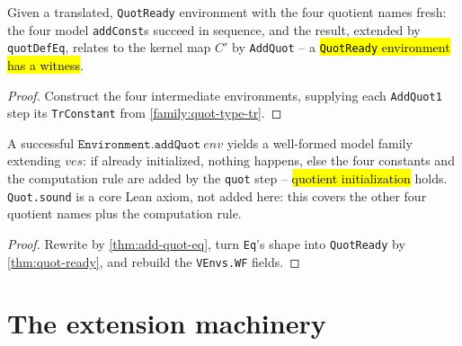\begin{theorem}
\label{thm:exists-add-quot}
\leanok
{}

 Given a translated, \texttt{QuotReady} environment with the four quotient
names fresh: the four model \texttt{addConst}s succeed in sequence, and the result,
extended by \texttt{quotDefEq}, relates to the kernel map $C'$ by \texttt{AddQuot} -- a
\hl{\texttt{QuotReady} environment has a witness}.
\end{theorem}
\begin{proof}
\leanok
{} Construct the four intermediate environments, supplying each
\texttt{AddQuot1} step its \texttt{TrConstant} from \ref{family:quot-type-tr}.
\end{proof}

\begin{theorem}
\label{thm:add-quot-wf}
\leanok
{}

 A successful $\mathtt{Environment.addQuot}\ env$ yields a well-formed
model family extending $ves$: if already initialized, nothing happens, else the four
constants and the computation rule are added by the \texttt{quot} step -- \hl{quotient
initialization} holds.
 \texttt{Quot.sound} is a core Lean axiom, not added here: this covers the
other four quotient names plus the computation rule.
\end{theorem}
\begin{proof}
\leanok
{} Rewrite by \ref{thm:add-quot-eq}, turn \texttt{Eq}'s shape into
\texttt{QuotReady} by \ref{thm:quot-ready}, and rebuild the \texttt{VEnvs.WF} fields.
\end{proof}

\section{The extension machinery}

